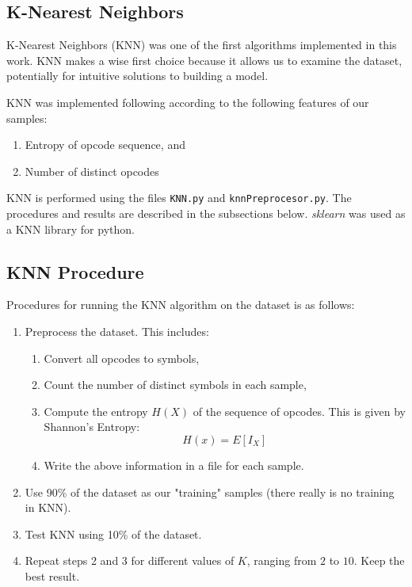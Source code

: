 \documentclass[12pt]{article}
\begin{document}
\subsection{K-Nearest Neighbors}
K-Nearest Neighbors (KNN) was one of the first algorithms implemented in this work. KNN makes a wise first choice because it allows us to examine the dataset, potentially for intuitive solutions to building a model.

KNN was implemented following according to the following features of our samples:
  \begin{enumerate}
    \item Entropy of opcode sequence, and
    \item Number of distinct opcodes
  \end{enumerate}
  KNN is performed using the files \texttt{KNN.py} and \texttt{knnPreprocesor.py}. The procedures and results are described in the subsections below. \textit{sklearn} was used as a KNN library for python.

\subsection*{KNN Procedure}
  Procedures for running the KNN algorithm on the dataset is as follows:
  \begin{enumerate}
    \item Preprocess the dataset. This includes:
        \begin{enumerate}
          \item Convert all opcodes to symbols,
          \item Count the number of distinct symbols in each sample,
          \item Compute the entropy $H(X)$ of the sequence of opcodes. This is given by Shannon's Entropy:
          \begin{equation}
            H(x) = E[I_X] 
          \end{equation}
        \item Write the above information in a file for each sample.
        \end{enumerate}
      \item Use 90\% of the dataset as our "training" samples (there really is no training in KNN).
      \item Test KNN using 10\% of the dataset.
      \item Repeat steps 2 and 3 for different values of $K$, ranging from $2$ to $10$. Keep the best result.
  \end{enumerate}
\end{document}
